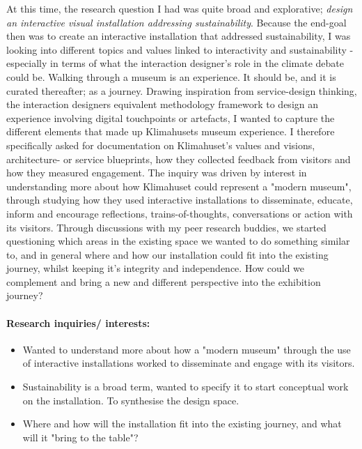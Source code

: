At this time, the research question I had was quite broad and explorative; \emph{design an interactive visual installation addressing sustainability}. Because the end-goal then was to create an interactive installation that addressed sustainability, I was looking into different topics and values linked to interactivity and sustainability - especially in terms of what the interaction designer's role in the climate debate could be. Walking through a museum is an experience. It should be, and it is curated thereafter; as a journey. Drawing inspiration from service-design thinking, the interaction designers equivalent methodology framework to design an experience involving digital touchpoints or artefacts, I wanted to capture the different elements that made up Klimahusets museum experience. I therefore specifically asked for documentation on Klimahuset's values and visions, architecture- or service blueprints, how they collected feedback from visitors and how they measured engagement. The inquiry was driven by interest in understanding more about how Klimahuset could represent a "modern museum", through studying how they used interactive installations to disseminate, educate, inform and encourage reflections, trains-of-thoughts, conversations or action with its visitors. Through discussions with my peer research buddies, we started questioning which areas in the existing space we wanted to do something similar to, and in general where and how our installation could fit into the existing journey, whilst keeping it’s integrity and independence. How could we complement and bring a new and different perspective into the exhibition journey?

\paragraph{Research inquiries/ interests: }
\begin{itemize}
    \item Wanted to understand more about how a "modern museum" through the use of interactive installations worked to disseminate and engage with its visitors.
    \item Sustainability is a broad term, wanted to specify it to start conceptual work on the installation. To synthesise the design space.
    \item Where and how will the installation fit into the existing journey, and what will it "bring to the table"?
\end{itemize}



